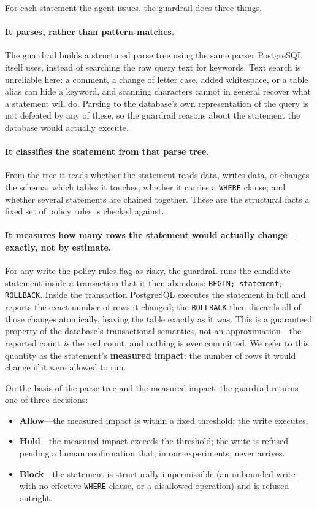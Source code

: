 \documentclass[11pt]{article}
\newcommand{\code}[1]{\texttt{#1}}
\begin{document}
For each statement the agent issues, the guardrail does three things.

\paragraph{It parses, rather than pattern-matches.} The guardrail builds a
structured parse tree using the same parser PostgreSQL itself uses, instead of
searching the raw query text for keywords. Text search is unreliable here: a
comment, a change of letter case, added whitespace, or a table alias can hide a
keyword, and scanning characters cannot in general recover what a statement will
do. Parsing to the database's own representation of the query is not defeated by
any of these, so the guardrail reasons about the statement the database would
actually execute.

\paragraph{It classifies the statement from that parse tree.} From the tree it
reads whether the statement reads data, writes data, or changes the schema; which
tables it touches; whether it carries a \code{WHERE} clause; and whether several
statements are chained together. These are the structural facts a fixed set of
policy rules is checked against.

\paragraph{It measures how many rows the statement would actually change---exactly,
not by estimate.} For any write the policy rules flag as risky, the guardrail runs
the candidate statement inside a transaction that it then abandons:
\code{BEGIN; \textlangle statement\textrangle; ROLLBACK}. Inside the transaction
PostgreSQL executes the statement in full and reports the exact number of rows it
changed; the \code{ROLLBACK} then discards all of those changes atomically, leaving
the table exactly as it was. This is a guaranteed property of the database's
transactional semantics, not an approximation---the reported count \emph{is} the
real count, and nothing is ever committed. We refer to this quantity as the
statement's \textbf{measured impact}: the number of rows it would change if it were
allowed to run.

On the basis of the parse tree and the measured impact, the guardrail returns one
of three decisions:

\begin{itemize}[itemsep=2pt,topsep=4pt]
  \item \textbf{Allow}---the measured impact is within a fixed threshold; the write
    executes.
  \item \textbf{Hold}---the measured impact exceeds the threshold; the write is
    refused pending a human confirmation that, in our experiments, never arrives.
  \item \textbf{Block}---the statement is structurally impermissible (an unbounded
    write with no effective \code{WHERE} clause, or a disallowed operation) and is
    refused outright.
\end{itemize}
\end{document}
